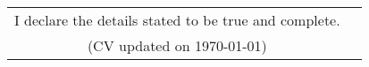 \documentclass[a4paper,11pt]{article}
\makeatletter
\newcommand{\resumePOR}[3]{
\vspace{0.5mm}\item
    \begin{tabular*}{0.97\textwidth}[t]{l@{\extracolsep{\fill}}r}
        \textbf{#1}\hspace{0.3mm}#2 & \textit{\small{#3}} 
    \end{tabular*}
    \vspace{-2mm}
}
\newcommand{\resumeSubHeadingListStart}{\begin{itemize}[leftmargin=*,labelsep=0mm]}
\newcommand{\resumeItemListStart}{\begin{justify}\begin{itemize}[leftmargin=3ex, rightmargin=2ex, noitemsep,labelsep=1.2mm,itemsep=0mm]\small}
\newcommand{\resumeSubHeadingListEnd}{\end{itemize}\vspace{2mm}}
\newcommand{\resumeItemListEnd}{\end{itemize}\end{justify}\vspace{-2mm}}
\makeatother
\begin{document}





    

\vfill
{
\begin{center}
\begin{tabularx}{\linewidth}{C r} %
  I declare the details stated to be true and complete. \\
  (CV updated on \today)
\end{tabularx}
\end{center}

}



\end{document}
